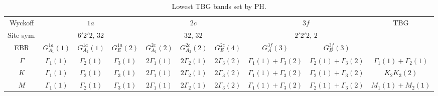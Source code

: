 %
%


\begin{table}[H]
\scriptsize
\caption{Lowest TBG bands set by PH.}
\centering
\begin{tabular}{|c|c|c|c|c|c|c|c|c|c|}
\hline
Wyckoff & \multicolumn{3}{c|}{$1a$} & \multicolumn{3}{c|}{$2c$} & \multicolumn{2}{c|}{$3f$} & \multirow{3}{*}{TBG} \\
\cline{1-9}
Site sym. & \multicolumn{3}{c|}{$6'2'2$, $32$} & \multicolumn{3}{c|}{$32$, $32$} & \multicolumn{2}{c|}{$2'2'2$, $2$} &  \\
\cline{1-9}
EBR      & $G_{A_1}^{1a}(1)$ & $G_{A_2}^{1a}(1)$ & $G_{E}^{1a}(2)$ & $G_{A_1}^{2c}(2)$ & $G_{A_2}^{2c}(2)$ & $G_{E}^{2c}(4)$   & $G_{A}^{3f}(3)$ & $G_{B}^{3f}(3)$ &  \\
\hline
$\Gamma$ & $\Gamma_1(1)$ & $\Gamma_2(1)$ & $\Gamma_3(1)$ & $2\Gamma_1(1)$ & $2\Gamma_2(1)$ & $2\Gamma_3(2)$ & $\Gamma_1(1)+\Gamma_3(2)$ & $\Gamma_2(1)+\Gamma_3(2)$ & $\Gamma_1(1)+\Gamma_2(1)$ \\
\hline
$K$ & $\Gamma_1(1)$ & $\Gamma_2(1)$ & $\Gamma_3(1)$ & $2\Gamma_1(1)$ & $2\Gamma_2(1)$ & $2\Gamma_3(2)$ & $\Gamma_1(1)+\Gamma_3(2)$ & $\Gamma_2(1)+\Gamma_3(2)$ & $K_2K_3(2)$ \\
\hline
$M$ & $\Gamma_1(1)$ & $\Gamma_2(1)$ & $\Gamma_3(1)$ & $2\Gamma_1(1)$ & $2\Gamma_2(1)$ & $2\Gamma_3(2)$ & $\Gamma_1(1)+\Gamma_3(2)$ & $\Gamma_2(1)+\Gamma_3(2)$ & $M_1(1) + M_2(1)$ \\
\hline
\end{tabular}
\label{tab:matbg-irreps}
\end{table}

